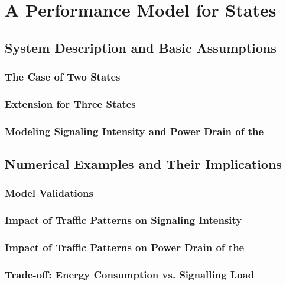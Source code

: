 \section{A Performance Model for   States}\label{sec:network:performance_model}
\cite{Schwartz2013c}

\subsection{System Description and Basic Assumptions}\label{sec:network:performance_model:system_description}

\subsubsection*{The Case of Two  States}\label{sec:network:performance_model:system_description:two_states}
\subsubsection*{Extension for Three  States}\label{sec:network:performance_model:system_description:three_states}
\subsubsection*{Modeling Signaling Intensity and Power Drain of the }\label{sec:network:performance_model:system_description:metrics}

\subsection{Numerical Examples and Their Implications}\label{sec:network:performance_model:numerical_examples}
\subsubsection*{Model Validations}\label{sec:network:performance_model:validations}
\subsubsection*{Impact of Traffic Patterns on Signaling Intensity}\label{sec:network:performance_model:signaling_intensity}
\subsubsection*{Impact of Traffic Patterns on Power Drain of the }\label{sec:network:performance_model:power_drain}
\subsubsection*{Trade-off: Energy Consumption vs. Signalling Load}\label{sec:network:performance_model:trade_off}
